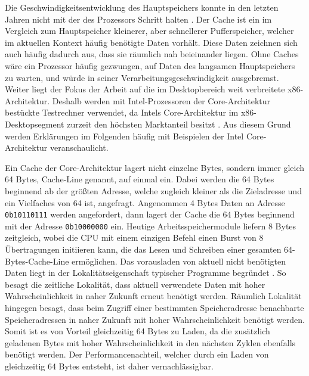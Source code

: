 Die Geschwindigkeitsentwicklung des Hauptspeichers konnte in den letzten Jahren nicht mit der des Prozessors Schritt halten \cite{speedGapCPUandRAM}. Der Cache ist ein im Vergleich zum Hauptspeicher kleinerer, aber schnellerer Pufferspeicher, welcher im aktuellen Kontext häufig benötigte Daten vorhält. Diese Daten zeichnen sich auch häufig dadurch aus, dass sie räumlich nah beieinander liegen.
Ohne Caches wäre ein Prozessor häufig gezwungen, auf Daten des langsamen Hauptspeichers zu warten, und würde in seiner Verarbeitungsgeschwindigkeit ausgebremst. %
Weiter liegt der Fokus der Arbeit auf die im Desktopbereich weit verbreitete x86-Architektur. Deshalb werden mit Intel-Prozessoren der Core-Architektur bestückte Testrechner verwendet, da Intels Core-Architektur im x86-Desktopsegment zurzeit den höchsten Marktanteil besitzt \cite{AMDIntelMarketShare}. Aus diesem Grund werden Erklärungen im Folgenden häufig mit Beispielen der Intel Core-Architektur veranschaulicht.

Ein Cache der Core-Architektur lagert nicht einzelne Bytes, sondern immer gleich 64 Bytes, Cache-Line genannt, auf einmal ein. Dabei werden die 64 Bytes beginnend ab der größten Adresse, welche zugleich kleiner als die Zieladresse und ein Vielfaches von 64 ist, angefragt.
Angenommen 4 Bytes Daten an Adresse \lstinline!0b10110111! %
werden angefordert, dann lagert der Cache die 64 Bytes beginnend mit der Adresse \lstinline!0b10000000! ein.
Heutige Arbeitsspeichermodule liefern 8 Bytes zeitgleich, wobei die CPU mit einem einzigen Befehl einen Burst von 8 Übertragungen initiieren kann, die das Lesen und Schreiben einer gesamten 64-Bytes-Cache-Line ermöglichen.
Das vorausladen von aktuell nicht benötigten Daten liegt in der Lokalitätseigenschaft typischer Programme begründet \cite{tanenbaumLocality}. So besagt die zeitliche Lokalität, dass aktuell verwendete Daten mit hoher Wahrscheinlichkeit in naher Zukunft erneut benötigt werden. Räumlich Lokalität hingegen besagt, dass beim Zugriff einer bestimmten Speicheradresse benachbarte Speicheradressen in naher Zukunft mit hoher Wahrscheinlichkeit benötigt werden.
Somit ist es von Vorteil gleichzeitig 64 Bytes zu Laden, da die zusätzlich geladenen Bytes mit hoher Wahrscheinlichkeit in den nächsten Zyklen ebenfalls benötigt werden. Der Performancenachteil, welcher durch ein Laden von gleichzeitig 64 Bytes entsteht, ist daher vernachlässigbar.

